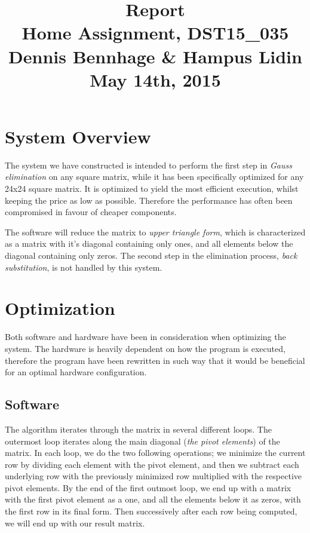 \documentclass[a4paper,9pt,fleqn]{article}
\title{
{\bf Report}\\
\vspace{0.2cm}
%
Home Assignment, DST15\_035\\
\vspace{1cm}
%
{\large Dennis Bennhage \& Hampus Lidin}\\
\vspace{10cm}
%
May 14th, 2015
}
\date{}
\begin{document}
\maketitle

\newpage

\section{System Overview}
The system we have constructed is intended to perform the first step in {\it Gauss elimination}
on any square matrix, while it has been specifically optimized for any 24x24 square matrix.
It is optimized to yield the most efficient execution, whilst keeping the price as low as
possible. Therefore the performance has often been compromised in favour of cheaper components.

The software will reduce the matrix to {\it upper triangle form}, which is characterized
as a matrix with it's diagonal containing only ones, and all elements below the diagonal
containing only zeros. The second step in the elimination process, {\it back substitution},
is not handled by this system.

\section{Optimization}
Both software and hardware have been in consideration when optimizing the system. The hardware
is heavily dependent on how the program is executed, therefore the program have been 
rewritten in such way that it would be beneficial for an optimal hardware configuration.

\subsection{Software}
The algorithm iterates through the matrix in several different loops. The outermost loop iterates along
the main diagonal ({\it the pivot elements}) of the matrix. In each loop, we do the two following
operations; we minimize the current row by dividing each element with the pivot element, and then we
subtract each underlying row with the previously minimized row multiplied with the respective
pivot elements. By the end of the first outmost loop, we end up with a matrix with the first pivot
element as a one, and all the elements below it as zeros, with the first row in its final form.
Then successively after each row being computed, we will end up with our result matrix.
\end{document}
